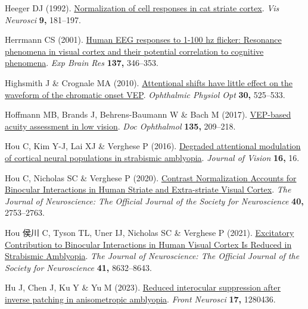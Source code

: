 \documentclass[
  letterpaper,
  DIV=11,
  numbers=noendperiod]{scrartcl}
\newlength{\cslhangindent}
\newenvironment{CSLReferences}[2] %
 {\begin{list}{}{%
  \setlength{\itemindent}{0pt}
  \setlength{\leftmargin}{0pt}
  \setlength{\parsep}{0pt}
  \ifodd #1
   \setlength{\leftmargin}{\cslhangindent}
   \setlength{\itemindent}{-1\cslhangindent}
  \fi
  \setlength{\itemsep}{#2\baselineskip}}}
 {\end{list}}
\begin{document}
\begin{CSLReferences}{1}{1}
Heeger DJ (1992).
\href{https://doi.org/10.1017/s0952523800009640}{Normalization of cell
responses in cat striate cortex}. \emph{Vis Neurosci} \textbf{9,}
181--197.

Herrmann CS (2001). \href{https://doi.org/10.1007/s002210100682}{Human
EEG responses to 1-100 hz flicker: Resonance phenomena in visual cortex
and their potential correlation to cognitive phenomena}. \emph{Exp Brain
Res} \textbf{137,} 346--353.

Highsmith J \& Crognale MA (2010).
\href{https://doi.org/10.1111/j.1475-1313.2010.00747.x}{Attentional
shifts have little effect on the waveform of the chromatic onset VEP}.
\emph{Ophthalmic Physiol Opt} \textbf{30,} 525--533.

Hoffmann MB, Brands J, Behrens-Baumann W \& Bach M (2017).
\href{https://doi.org/10.1007/s10633-017-9613-y}{VEP-based acuity
assessment in low vision}. \emph{Doc Ophthalmol} \textbf{135,} 209--218.

Hou C, Kim Y-J, Lai XJ \& Verghese P (2016).
\href{https://doi.org/10.1167/16.3.16}{Degraded attentional modulation
of cortical neural populations in strabismic amblyopia}. \emph{Journal
of Vision} \textbf{16,} 16.

Hou C, Nicholas SC \& Verghese P (2020).
\href{https://doi.org/10.1523/JNEUROSCI.2043-19.2020}{Contrast
{Normalization} {Accounts} for {Binocular} {Interactions} in {Human}
{Striate} and {Extra}-striate {Visual} {Cortex}}. \emph{The Journal of
Neuroscience: The Official Journal of the Society for Neuroscience}
\textbf{40,} 2753--2763.

Hou 侯川 C, Tyson TL, Uner IJ, Nicholas SC \& Verghese P (2021).
\href{https://doi.org/10.1523/JNEUROSCI.0268-21.2021}{Excitatory
{Contribution} to {Binocular} {Interactions} in {Human} {Visual}
{Cortex} {Is} {Reduced} in {Strabismic} {Amblyopia}}. \emph{The Journal
of Neuroscience: The Official Journal of the Society for Neuroscience}
\textbf{41,} 8632--8643.

Hu J, Chen J, Ku Y \& Yu M (2023).
\href{https://doi.org/10.3389/fnins.2023.1280436}{Reduced interocular
suppression after inverse patching in anisometropic amblyopia}.
\emph{Front Neurosci} \textbf{17,} 1280436.


\end{CSLReferences}
\end{document}
